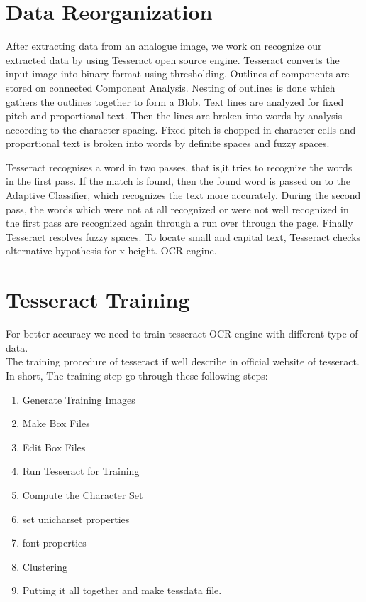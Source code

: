 \section{Data Reorganization}
After extracting data from an analogue image, we work on recognize our extracted data by using Tesseract open source engine.  Tesseract converts  the  input  image  into  binary  format  using thresholding. Outlines of  components are  stored  on  connected Component   Analysis.   Nesting   of   outlines   is   done   which gathers  the  outlines  together  to  form  a  Blob. Text  lines  are analyzed  for  fixed  pitch  and  proportional  text.  Then  the  lines are  broken  into  words  by  analysis  according  to  the  character spacing.   Fixed pitch   is chopped   in   character   cells   and proportional  text  is  broken  into  words  by  definite  spaces  and fuzzy spaces. \cite{OCR}

Tesseract  recognises  a  word  in  two  passes,  that  is,it  tries  to recognize  the  words in  the  first  pass. If  the  match  is found, then  the  found word  is  passed on to the Adaptive  Classifier, which recognizes the text more accurately. During the second pass, the  words  which  were  not at  all recognized or  were  not well recognized in the first pass are recognized again through a run  over through the  page.  Finally  Tesseract  resolves  fuzzy spaces.  To locate  small  and  capital  text, Tesseract  checks alternative hypothesis for x-height. OCR engine.\cite{OCR} \cite{TesseractORCEngineOfficialWeb}
\section{Tesseract Training}
For better accuracy we need to train tesseract OCR engine with different type of data.\\
The training procedure of tesseract if well describe in official website of tesseract.\cite{TrainingTesseract}\cite{OCR} 
In short, The training step go through these following steps:
\begin{enumerate}
\item Generate Training Images
\item Make Box Files
\item Edit Box Files
\item Run Tesseract for Training
\item Compute the Character Set
\item set unicharset properties
\item font properties
\item Clustering
\item Putting it all together and make tessdata file.
\end{enumerate}